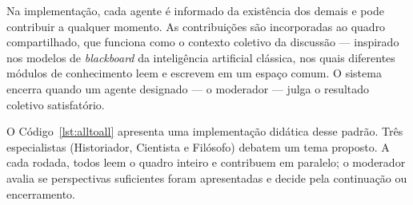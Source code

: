 Na implementação, cada agente é informado da existência dos demais e pode contribuir
a qualquer momento. As contribuições são incorporadas ao quadro compartilhado, que
funciona como o contexto coletivo da discussão --- inspirado nos modelos de
\textit{blackboard} da inteligência artificial clássica, nos quais diferentes módulos
de conhecimento leem e escrevem em um espaço comum. O sistema encerra quando um
agente designado --- o moderador --- julga o resultado coletivo satisfatório.

O Código~\ref{lst:alltoall} apresenta uma implementação didática desse padrão. Três
especialistas (Historiador, Cientista e Filósofo) debatem um tema proposto. A cada
rodada, todos leem o quadro inteiro e contribuem em paralelo; o moderador avalia se
perspectivas suficientes foram apresentadas e decide pela continuação ou encerramento.

